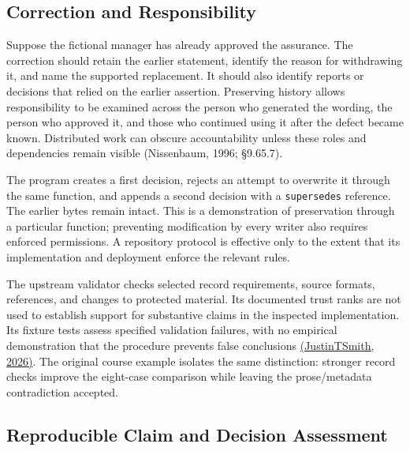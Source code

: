 \hypertarget{M09-correction-and-responsibility}{%
\subsection{Correction and
Responsibility}\label{M09-correction-and-responsibility}}

\noindent \noindent Suppose the fictional manager has already approved the
assurance. The correction should retain the earlier statement, identify
the reason for withdrawing it, and name the supported replacement. It
should also identify reports or decisions that relied on the earlier
assertion. Preserving history allows responsibility to be examined
across the person who generated the wording, the person who approved it,
and those who continued using it after the defect became known.
Distributed work can obscure accountability unless these roles and
dependencies remain visible (Nissenbaum, 1996; §9.65.7).

The program creates a first decision, rejects an attempt to overwrite it
through the same function, and appends a second decision with a
\texttt{supersedes} reference. The earlier bytes remain intact. This is
a demonstration of preservation through a particular function;
preventing modification by every writer also requires enforced
permissions. A repository protocol is effective only to the extent that
its implementation and deployment enforce the relevant rules.

The upstream validator checks selected record requirements, source
formats, references, and changes to protected material. Its documented
trust ranks are not used to establish support for substantive claims in
the inspected implementation. Its fixture tests assess specified
validation failures, with no empirical demonstration that the procedure
prevents false conclusions
\href{https://github.com/JustinTSmith/Agent-Epistemic-Engine/blob/ae6ad9296c5a85b787978b121d76408197d5c3da/scripts/validate.py}{(JustinTSmith,
2026)}. The original course example isolates the same distinction:
stronger record checks improve the eight-case comparison while leaving
the prose/metadata contradiction accepted.

\hypertarget{M09-reproducible-claim-and-decision-assessment}{%
\subsection{Reproducible Claim and Decision
Assessment}\label{M09-reproducible-claim-and-decision-assessment}}

